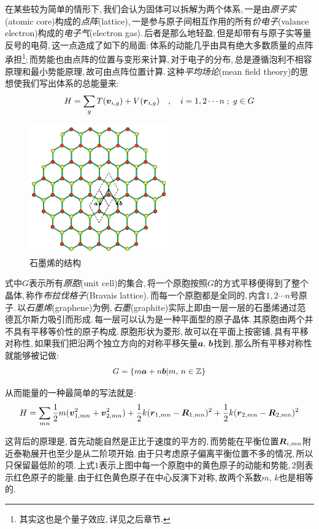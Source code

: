在某些较为简单的情形下,\,我们会认为固体可以拆解为两个体系,\,一是由\emph{原子实}(atomic core)构成的\emph{点阵}(lattice),\,一是参与原子间相互作用的所有\emph{价电子}(valance electron)构成的\emph{电子气}(electron gas).\,后者是那么地轻盈,\,但是却带有与原子实等量反号的电荷,\,这一点造成了如下的局面:\,体系的动能几乎由具有绝大多数质量的点阵承担\footnote{其实这也是个量子效应,\,详见之后章节.};\,而势能也由点阵的位置与变形来计算,\,对于电子的分布,\,总是遵循泡利不相容原理和最小势能原理,\,故可由点阵位置计算.\,这种\emph{平均场论}(mean field theory)的思想使我们写出体系的总能量来:
\[H=\sum_g T(\boldsymbol{v}_{i,g})+V(\boldsymbol{r}_{i,g})\quad ,\quad i=1,2\cdots n\;;\;g\in G\]

\begin{figure}
\centering
\includegraphics[width=6cm]{image/5-3-4.png}
\caption{石墨烯的结构}\label{fig:graphene}
\end{figure}
式中$G$表示所有\emph{原胞}(unit cell)的集合,\,将一个原胞按照$G$的方式平移便得到了整个晶体,\,称作\emph{布拉伐格子}(Bravais lattice).\,而每一个原胞都是全同的,\,内含$1,2\cdots n$号原子.\,以\emph{石墨烯}(graphene)为例,\,\emph{石墨}(graphite)实际上即由一层一层的石墨烯通过范德瓦尔斯力吸引而形成.\,每一层可以认为是一种平面型的原子晶体.\,其原胞由两个并不具有平移等价性的原子构成.\,原胞形状为菱形,\,故可以在平面上按密铺,\,具有平移对称性,\,如果我们把沿两个独立方向的对称平移矢量$\boldsymbol{a},\,\boldsymbol{b}$找到,\,那么所有平移对称性就能够被记做:
\[G=\{m\boldsymbol{a}+n\boldsymbol{b}|m,\,n\in  \mathbb{Z}\}\]

从而能量的一种最简单的写法就是:
\[H=\sum_{mn}  \frac{1}{2}m(\boldsymbol{v}_{1,mn}^2+\boldsymbol{v}_{2,mn}^2)+\frac{1}{2}k(\boldsymbol{r}_{1,mn}-\boldsymbol{R}_{1,mn})^2+\frac{1}{2}k(\boldsymbol{r}_{2,mn}-\boldsymbol{R}_{2,mn})^2\]

这背后的原理是,\,首先动能自然是正比于速度的平方的,\,而势能在平衡位置$\boldsymbol{R}_{i,mn}$附近泰勒展开也至少是从二阶项开始.\,由于只考虑原子偏离平衡位置不多的情况,\,所以只保留最低阶的项.\,上式$1$表示上图中每一个原胞中的黄色原子的动能和势能,\,$2$则表示红色原子的能量.\,由于红色黄色原子在中心反演下对称,\,故两个系数$m,\,k$也是相等的.

